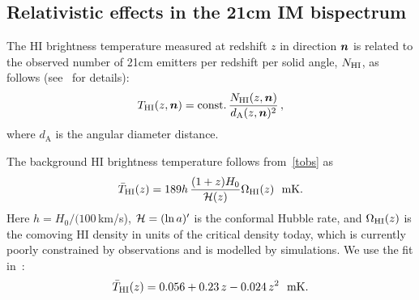 \subsection{Relativistic effects in the 21cm IM bispectrum}
%
The HI brightness temperature measured at redshift $z$ in direction $\bm {n}$ is related to the observed number of 21cm emitters per redshift per solid angle, $N_{{\mathrm{HI}}}$, as follows (see~\cite{Hall:2012wd,Alonso:2015uua} for details):
\begin{equation}
T_{{\mathrm{HI}}}(z,\bm {n})= \mathrm{const.}\, \frac{ N_{{\mathrm{HI}}}(z,\bm {n})}{d_\mathrm{A}(z,\bm {n})^2}\,,
\label{tobs}
\end{equation}
where $d_\mathrm{A}$ is the angular diameter distance.  

The background HI brightness temperature follows from~\eqref{tobs} as~\cite{Villaescusa-Navarro:2018vsg}
\begin{equation} \label{bart}
\bar{T}_{{\mathrm{HI}}}(z)= 189h\,\frac{(1+z)H_0}{\mathcal{H}(z)}\Omega_{{\mathrm{HI}}}(z)~~\mathrm{mK}.
\end{equation}
Here $h=H_0/(100\,$km/s), $\mathcal{H}=(\ln a)'$ is the conformal Hubble rate, and $\Omega_{{\mathrm{HI}}}(z)$ is the comoving HI density in units of the critical density today, which is currently poorly constrained by observations and is modelled by simulations. We use the fit in~\cite{Santos:2017qgq}:
\begin{equation}
\bar{T}_{{\mathrm{HI}}}(z) = 0.0 56 +0.23\,z -0.024\, z^{2} ~~ \mathrm{mK}. \label{e1.24}
\end{equation}

